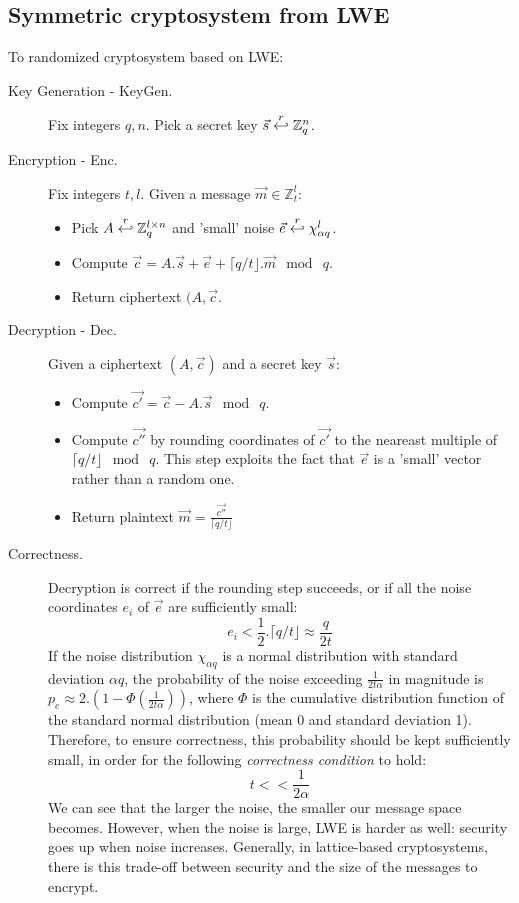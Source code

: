 \subsection{Symmetric cryptosystem from LWE}
\label{sec:LWESymmetric}
To randomized cryptosystem based on LWE:
\begin{description}
\item[Key Generation - KeyGen.] Fix integers $q, n$. Pick a secret key
  $\vec{s} \stackrel{r}{\hookleftarrow} \mathbb{Z}_q^n$.
\item [Encryption - Enc.] Fix integers $t,l$. Given a message
  $\vec{m} \in \mathbb{Z}_t^l$:
  \begin{itemize}
  \item Pick $A \stackrel{r}{\hookleftarrow} \mathbb{Z}_q^{l \times n}$ and 'small' noise
    $\vec{e} \stackrel{r}{\hookleftarrow} \chi_{\alpha q}^l$.
  \item Compute
    $\vec{c} = A.\vec{s} + \vec{e} + \lceil q/t \rfloor . \vec{m} \mod \ q$.
  \item Return ciphertext $(A, \vec{c}$.
  \end{itemize}
\item [Decryption - Dec.] Given a ciphertext $(A,\vec{c})$ and a secret key
  $\vec{s}$:
  \begin{itemize}
  \item Compute $\vec{c'} = \vec{c} - A.\vec{s} \mod \ q$.
  \item Compute $\vec{c''}$ by rounding coordinates of $\vec{c'}$ to the
    neareast multiple of $\lceil q/t \rfloor \mod \ q$. This step exploits the
    fact that $\vec{e}$ is a 'small' vector rather than a random one.
  \item Return plaintext $\vec{m} = \frac{\vec{c''}}{\lceil q/t \rfloor}$
  \end{itemize}

\item [Correctness.] Decryption is correct if the rounding step succeeds, or if
  all the noise coordinates $e_i$ of $\vec{e}$ are sufficiently small:
  \[
    e_i < \frac{1}{2} . \lceil q/t \rfloor \approx \frac{q}{2t}
  \]
  If the noise distribution $\chi_{\alpha q}$ is a normal distribution with
  standard deviation $\alpha q$, the probability of the noise exceeding
  $\frac{1}{2t\alpha}$ in magnitude is
  $p_e \approx 2.\left( 1 - \Phi\left( \frac{1}{2t\alpha} \right) \right)$,
  where $\Phi$ is the cumulative distribution function of the standard normal
  distribution (mean 0 and standard deviation 1). Therefore, to ensure
  correctness, this probability should be kept sufficiently small, in order for the following
  \emph{correctness condition} to hold:
  \[
    t << \frac{1}{2\alpha}
  \]
  We can see that the larger the noise, the smaller our message space
  becomes. However, when the noise is large, LWE is harder as well: security
  goes up when noise increases.  Generally, in lattice-based cryptosystems, there
  is this trade-off between security and the size of the messages to encrypt.


\end{description}
